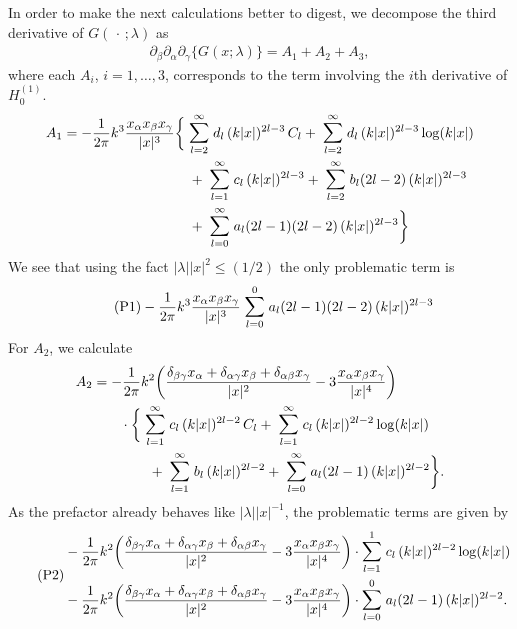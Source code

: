 In order to make the next calculations better to digest, we decompose the third derivative of $G(\,\cdot\, ; \lambda)$ as 
\begin{align*}
  \partial_\beta \partial_\alpha \partial_\gamma \big\{G(x; \lambda)\big\}
  = A_1 + A_2 + A_3,
\end{align*}
where each $A_i$, $i = 1,\dots,3$, corresponds to the term involving the $i$th derivative of $H_0^{(1)}$.
\begin{align*}
  A_1 = - \frac{1}{2 \pi } k^3 \frac{x_\alpha x_\beta x_\gamma}{|x|^3} 
  &\bigg\{
     \; \mathlarger{\sum}_{l = 2}^\infty \; d_l \, (k|x|)^{2l - 3} \, C_l + \; \mathlarger{\sum}_{l = 2}^\infty \; d_l \, (k|x|)^{2l - 3} \log(k|x|)  \\
  &\quad  + \; \mathlarger{\sum}_{l = 1}^\infty \; c_l \, (k|x|)^{2l - 3} + \; \mathlarger{\sum}_{l = 2}^\infty \; b_l (2l - 2) \, (k|x|)^{2l - 3} \\
  &\quad + \; \mathlarger{\sum}_{l = 0}^\infty \; a_l (2l - 1) (2l - 2) \, (k|x|)^{2l - 3} 
  \bigg\}
\end{align*}
We see that using the fact $|\lambda| |x|^2 \leq (1/2)$ the only problematic term is
\begin{align}
  \label{eq:P1}
  \tag{P1}- \frac{1}{2 \pi } k^3 \frac{x_\alpha x_\beta x_\gamma}{|x|^3}  \; \mathlarger{\sum}_{l = 0}^{0} \; a_l (2l - 1) (2l - 2) \, (k|x|)^{2l - 3} 
\end{align}
For $A_2$, we calculate
\begin{align*}
  A_2 &= - \frac{1}{2\pi} k^2 \bigg(\frac{\delta_{\beta\gamma} x_\alpha + \delta_{\alpha \gamma} x_\beta + \delta_{\alpha \beta} x_\gamma}{|x|^2} - 3 \frac{x_\alpha x_\beta x_\gamma}{|x|^4} \bigg) \\ 
  &\qquad \cdot 
  \bigg\{
    \; \mathlarger{\sum}_{l = 1}^\infty \; c_l \, (k|x|)^{2l - 2} \, C_l 
  + \; \mathlarger{\sum}_{l = 1}^\infty \; c_l \, (k|x|)^{2l - 2} \log(k|x|) \\
  &\qquad\qquad+ \; \mathlarger{\sum}_{l = 1}^\infty \; b_l \, (k|x|)^{2l - 2} 
  + \; \mathlarger{\sum}_{l = 0}^\infty \; a_l (2l - 1) \, (k|x|)^{2l - 2} 
  \bigg\}.
\end{align*}
As the prefactor already behaves like $|\lambda| |x|^{-1}$, the problematic terms are given by
\begin{align}
  \label{eq:P2}
  \tag{P2}
  \begin{alignedat}{1}
  & - \frac{1}{2\pi} k^2 \bigg(\frac{\delta_{\beta\gamma} x_\alpha + \delta_{\alpha \gamma} x_\beta + \delta_{\alpha \beta} x_\gamma}{|x|^2} - 3 \frac{x_\alpha x_\beta x_\gamma}{|x|^4} \bigg) 
   \cdot \mathlarger{\sum}_{l = 1}^1 \; c_l \, (k|x|)^{2l - 2} \log(k|x|) \\
   &- \frac{1}{2\pi} k^2 \bigg(\frac{\delta_{\beta\gamma} x_\alpha + \delta_{\alpha \gamma} x_\beta + \delta_{\alpha \beta} x_\gamma}{|x|^2} - 3 \frac{x_\alpha x_\beta x_\gamma}{|x|^4} \bigg) 
  \cdot \mathlarger{\sum}_{l = 0}^0 \; a_l (2l - 1) \, (k|x|)^{2l - 2} .
  \end{alignedat}
\end{align}
